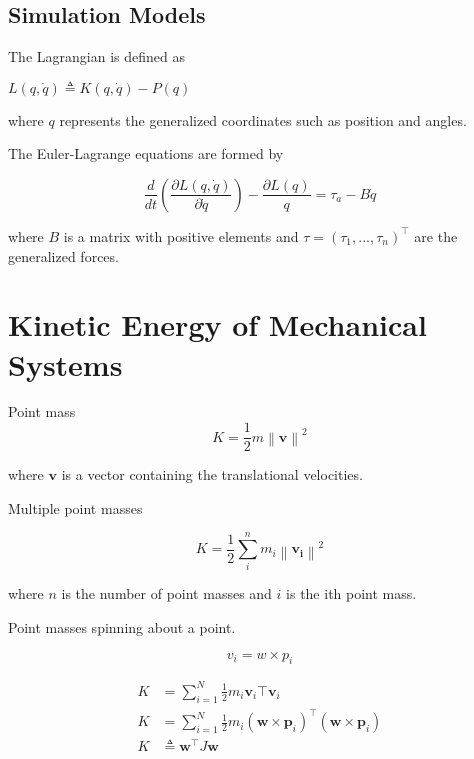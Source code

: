 \documentclass{article}[10pt]
\newcommand{\norm}[1]{\left\|#1\right\|}
\begin{document}
\begin{center}
\section*{Simulation Models}
\end{center}


The Lagrangian is defined as

$L(q,\dot{q}) \triangleq K(q,\dot{q}) - P(q)$

\noindent
where $q$ represents the generalized coordinates such as position and angles. 

The Euler-Lagrange equations are formed by

\begin{equation}
\frac{d}{dt}\left(\frac{\partial L(q,\dot{q})}{\partial \dot{q}}\right) - \frac{\partial L(q)}{q} = \tau_a - B\dot{q}
\end{equation}

\noindent
where $B$ is a matrix with positive elements and $\tau = (\tau_1,...,\tau_n)^\top$ are the generalized forces.


\section*{\hfil Kinetic Energy of Mechanical Systems \hfil}

Point mass
\begin{equation}
K = \frac{1}{2}m \norm{\mathbf{v}}^2
\end{equation}

\noindent
where $\mathbf{v}$ is a vector containing the translational velocities. 

Multiple point masses

\begin{equation}
K = \frac{1}{2} \sum^n_i m_i \norm{\mathbf{v_i}}^2
\end{equation}

\noindent
where $n$ is the number of point masses and $i$ is the ith point mass. 

Point masses spinning about a point.

$$v_i = w \times p_i$$

\begin{align}
K &= \sum^N_{i=1}\frac{1}{2}m_i\mathbf{v}_i\top\mathbf{v}_i \\
K &= \sum^N_{i=1}\frac{1}{2}m_i(\mathbf{w}\times\mathbf{p}_i)^\top (\mathbf{w}\times\mathbf{p}_i) \\
K &\triangleq \mathbf{w}^\top J \mathbf{w}
\end{align}
\end{document}
